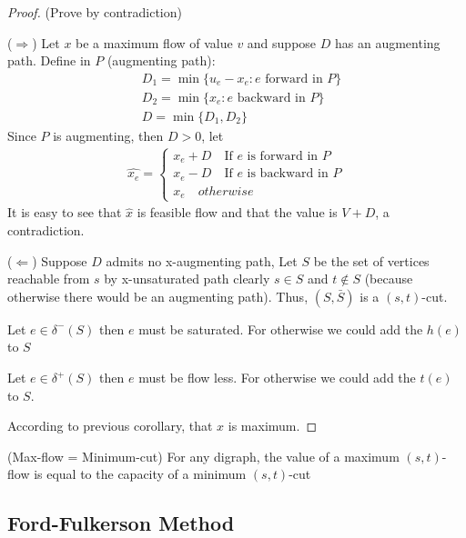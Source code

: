             \begin{proof}
                (Prove by contradiction) 

                ($\Rightarrow$) Let $x$ be a maximum flow of value $v$ and suppose $D$ has an augmenting path. Define in $P$ (augmenting path):
                \begin{align*}
                    & D_1 = \min \{u_e-x_e: e \text{ forward in } P\} \\
                    & D_2 = \min \{x_e: e \text{ backward in } P\}\\
                    & D = \min \{D_1, D_2\}
                \end{align*}
                Since $P$ is augmenting, then $D > 0$, let
                \begin{align*}
                    \hat{x_e} = \begin{cases}
                        x_e + D \quad \text{If $e$ is forward in $P$}\\
                        x_e - D \quad \text{If $e$ is backward in $P$}\\
                        x_e \quad otherwise
                    \end{cases}
                \end{align*}
                It is easy to see that $\hat{x}$ is feasible flow and that the value is $V+D$, a contradiction.

                ($\Leftarrow$) Suppose $D$ admits no x-augmenting path, Let $S$ be the set of vertices reachable from $s$ by x-unsaturated path clearly $s\in S$ and $t\notin S$ (because otherwise there would be an augmenting path). Thus, $(S, \bar{S})$ is a $(s, t)$-cut.

                Let $e\in \delta^-(S)$ then $e$ must be saturated. For otherwise we could add the $h(e)$ to $S$

                Let $e\in \delta^+(S)$ then $e$ must be flow less. For otherwise we could add the $t(e)$ to $S$.

                According to previous corollary, that $x$ is maximum.
            \end{proof}

            \begin{theorem}(Max-flow = Minimum-cut)
                For any digraph, the value of a maximum $(s, t)$-flow is equal to the capacity of a minimum $(s, t)$-cut
            \end{theorem}

        \subsection{Ford-Fulkerson Method}

